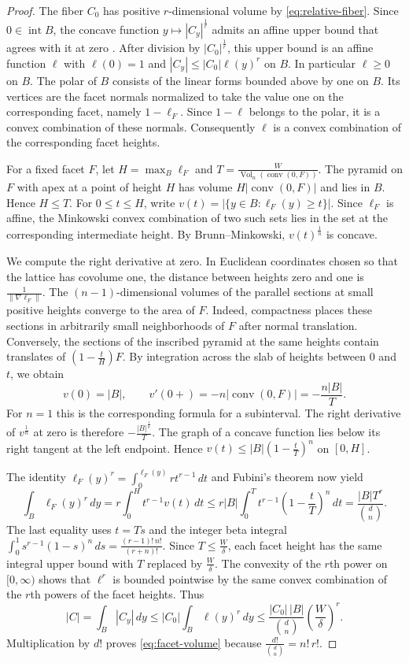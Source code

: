\documentclass[reqno, 11pt]{article}
\numberwithin{equation}{section}
\theoremstyle{definition}
\DeclareMathOperator{\conv}{conv}
\DeclareMathOperator{\Vol}{Vol}
\DeclareMathOperator{\intr}{int}
\begin{document}
\begin{proof}
The fiber $C_0$ has positive $r$-dimensional volume by
\eqref{eq:relative-fiber}. Since $0\in\intr B$, the concave function
$y\mapsto |C_y|^{\frac{1}{r}}$ admits an affine upper bound that
agrees with it at zero \cite[Theorem~23.4]{Rockafellar}. After
division by $|C_0|^{\frac{1}{r}}$, this upper bound is an affine
function $\ell$ with $\ell(0)=1$ and
$|C_y|\le |C_0|\ell(y)^r$ on $B$. In particular $\ell\ge0$ on $B$.
The polar of $B$ consists of the linear forms bounded above by one on
$B$. Its vertices are the facet normals normalized to take the value
one on the corresponding facet, namely $1-\ell_F$. Since $1-\ell$
belongs to the polar, it is a convex combination of these normals.
Consequently $\ell$ is a convex combination of the corresponding
facet heights.

For a fixed facet $F$, let $H=\max_B\ell_F$ and
$T=\frac{W}{\Vol_n(\conv(0,F))}$. The pyramid on $F$ with apex at
a point of height $H$ has volume $H|\conv(0,F)|$ and lies in $B$.
Hence $H\le T$. For $0\le t\le H$, write
$v(t)=|\{y\in B:\ell_F(y)\ge t\}|$. Since $\ell_F$ is affine,
the Minkowski convex combination of two such sets lies in the set at
the corresponding intermediate height. By Brunn--Minkowski,
$v(t)^{\frac{1}{n}}$ is concave.

We compute the right derivative at zero. In Euclidean coordinates
chosen so that the lattice has covolume one, the distance between
heights zero and one is $\frac{1}{\|\nabla\ell_F\|}$. The
$(n-1)$-dimensional volumes of the parallel sections at small positive
heights converge to the area of $F$. Indeed, compactness places these
sections in arbitrarily small neighborhoods of $F$ after normal
translation. Conversely, the sections of the inscribed pyramid at
the same heights contain translates of
$\left(1-\frac{t}{H}\right)F$. By integration across the slab of
heights between $0$ and $t$, we obtain
\[
 v(0)=|B|,\qquad v'(0+)=-n|\conv(0,F)|=-\frac{n|B|}{T}.
\]
For $n=1$ this is the corresponding formula for a subinterval.
The right derivative of $v^{\frac{1}{n}}$ at zero is therefore
$-\frac{|B|^{\frac{1}{n}}}{T}$. The graph of a concave function
lies below its right tangent at the left endpoint. Hence
$v(t)\le |B|\left(1-\frac{t}{T}\right)^n$ on $[0,H]$.

The identity $\ell_F(y)^r=\int_0^{\ell_F(y)}rt^{r-1}\,dt$
and Fubini's theorem now yield
\[
 \int_B\ell_F(y)^r\,dy
   =r\int_0^H t^{r-1}v(t)\,dt
   \le r|B|\int_0^T t^{r-1}\left(1-\frac{t}{T}\right)^n\,dt
   =\frac{|B|T^r}{\binom{d}{n}} .
\]
The last equality uses $t=Ts$ and the integer beta integral
$\int_0^1s^{r-1}(1-s)^n\,ds=\frac{(r-1)!\,n!}{(r+n)!}$.
Since $T\le\frac{W}{\delta}$, each facet height has the same integral
upper bound with $T$ replaced by $\frac{W}{\delta}$. The convexity
of the $r$th power on $[0,\infty)$ shows that $\ell^r$ is bounded
pointwise by the same convex combination of the $r$th powers of
the facet heights. Thus
\[
 |C|=\int_B|C_y|\,dy
 \le |C_0|\int_B\ell(y)^r\,dy
 \le \frac{|C_0|\,|B|}{\binom{d}{n}}
               \left(\frac{W}{\delta}\right)^r .
\]
Multiplication by $d!$ proves \eqref{eq:facet-volume} because
$\frac{d!}{\binom{d}{n}}=n!\,r!$.


\end{proof}
\end{document}
